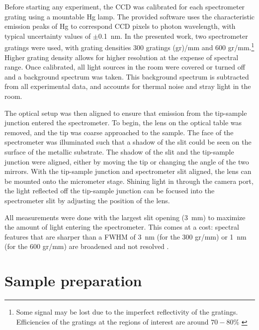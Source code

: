 \begin{figure} [h]
    \centering
    \caption{}
    \label{fig:expsetup:optics}
\end{figure}

Before starting any experiment, the \ac{CCD} was calibrated for each spectrometer grating using a mountable Hg lamp. The provided software uses the characteristic emission peaks of Hg to correspond \ac{CCD} pixels to photon wavelength, with typical uncertainty values of $\pm$\SI{0.1}{nm}. In the presented work, two spectrometer gratings were used, with grating densities 300 gratings (gr)/mm and 600 gr/mm.\footnote{Some signal may be lost due to the imperfect reflectivity of the gratings. Efficiencies of the gratings at the regions of interest are around $70 - 80 \%$ \citep{princetongratings}} Higher grating density allows for higher resolution at the expense of spectral range. Once calibrated, all light sources in the room were covered or turned off and a background spectrum was taken. This background spectrum is subtracted from all experimental data, and accounts for thermal noise and stray light in the room.

The optical setup was then aligned to ensure that emission from the tip-sample junction entered the spectrometer. To begin, the lens on the optical table was removed, and the tip was coarse approached to the sample. The face of the spectrometer was illuminated such that a shadow of the slit could be seen on the surface of the metallic substrate. The shadow of the slit and the tip-sample junction were aligned, either by moving the tip or changing the angle of the two mirrors. With the tip-sample junction and spectrometer slit aligned, the lens can be mounted onto the micrometer stage. Shining light in through the camera port, the light reflected off the tip-sample junction can be focused into the spectrometer slit by adjusting the position of the lens.

All measurements were done with the largest slit opening (\SI{3}{mm}) to maximize the amount of light entering the spectrometer. This comes at a cost: spectral features that are sharper than a \ac{FWHM} of \SI{3}{nm} (for the 300 gr/mm) or \SI{1}{nm} (for the 600 gr/mm) are broadened and not resolved \citep{princetonslit}. 



\section{Sample preparation}

